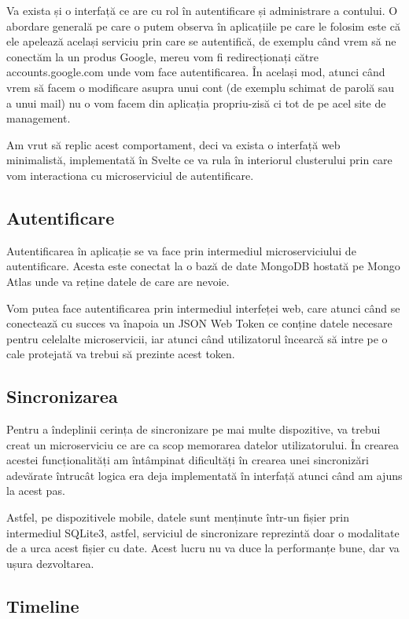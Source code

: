 Va exista și o interfață ce are cu rol în autentificare și administrare a contului. O abordare generală
pe care o putem observa în aplicațiile pe care le folosim este că ele apelează același serviciu
prin care se autentifică, de exemplu când vrem să ne conectăm la un produs Google, mereu
vom fi redirecționați către accounts.google.com unde vom face autentificarea. În același mod,
atunci când vrem să facem o modificare asupra unui cont (de exemplu schimat de parolă sau a unui mail)
nu o vom facem din aplicația propriu-zisă ci tot de pe acel site de management.

Am vrut să replic acest comportament, deci va exista o interfață web minimalistă, implementată în Svelte
ce va rula în interiorul clusterului prin care vom interactiona cu microserviciul de autentificare.

\subsection{Autentificare}

Autentificarea în aplicație se va face prin intermediul microserviciului de autentificare. Acesta este
conectat la o bază de date MongoDB hostată pe Mongo Atlas unde va reține datele de care are nevoie.

Vom putea face autentificarea prin intermediul interfeței web, care atunci când se conectează cu succes
va înapoia un JSON Web Token ce conține datele necesare pentru celelalte microservicii, iar atunci când utilizatorul
încearcă să intre pe o cale protejată va trebui să prezinte acest token.

\subsection{Sincronizarea}

Pentru a îndeplinii cerința de sincronizare pe mai multe dispozitive, va trebui creat un microserviciu
ce are ca scop memorarea datelor utilizatorului. În crearea acestei funcționalități
am întâmpinat dificultăți în crearea unei sincronizări adevărate întrucât logica
era deja implementată în interfață atunci când am ajuns la acest pas.

Astfel, pe dispozitivele mobile, datele sunt menținute într-un fișier prin intermediul SQLite3, astfel,
serviciul de sincronizare reprezintă doar o modalitate de a urca acest fișier cu date. Acest lucru
nu va duce la performanțe bune, dar va ușura dezvoltarea.

\subsection{Timeline}

